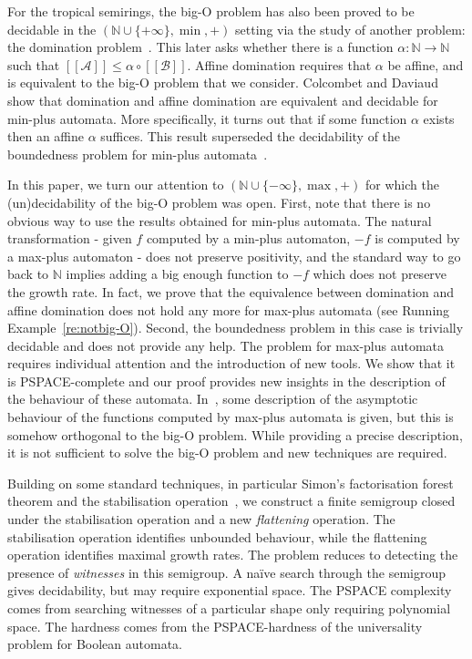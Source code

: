 \documentclass[10pt,a4paper]{amsart}
\theoremstyle{definition}
\numberwithin{equation}{section}
\theoremstyle{remark}
\newcommand{\autA}{\mathcal{A}}
\newcommand{\autB}{\mathcal{B}}
\newcommand{\brfunc}[1]{[\![#1]\!]}
\newcommand{\funcA}{\brfunc{\autA}}
\newcommand{\funcB}{\brfunc{\autB}}
\theoremstyle{remark}
\begin{document}
For the tropical semirings, the big-O problem has also been proved to be decidable in the $(\mathbb{N}\cup\{+\infty\},\min,+)$ setting via the study of another problem: the domination problem~\cite{Colcombet07, Colcombet09}. This later asks whether there is a function $\alpha:\mathbb{N} \to \mathbb{N}$ such that  $\funcA \le \alpha \circ \funcB$. Affine domination requires that $\alpha$ be affine, and is equivalent to the big-O problem that we consider. Colcombet and Daviaud~\cite{ColcombetD13} show that domination and affine domination are equivalent and decidable for min-plus automata. More specifically, it turns out that if some function $\alpha$ exists then an affine $\alpha$ suffices. This result superseded the decidability of the boundedness problem for min-plus automata~\cite{Hashiguchi91a, leung1988topological, Simon94}.

In this paper, we turn our attention to $(\mathbb{N}\cup\{-\infty\},\max,+)$ for which the (un)decidability of the big-O problem was open. First, note that there is no obvious way to use the results obtained for min-plus automata. The natural transformation - given $f$ computed by a min-plus automaton, $-f$ is computed by a max-plus automaton - does not preserve positivity, and the standard way to go back to $\mathbb{N}$ implies adding a big enough function to $-f$ which does not preserve the growth rate. In fact, we prove that the equivalence between domination and affine domination does not hold any more for max-plus automata (see Running Example~\ref{re:notbig-O}). Second, the boundedness problem in this case is trivially decidable and does not provide any help. The problem for max-plus automata requires individual attention and the introduction of new tools. We show that it is PSPACE-complete and our proof provides new insights in the description of the behaviour of these automata. In~\cite{ColcombetDZ14}, some description of the asymptotic behaviour of the functions computed by max-plus automata is given, but this is somehow orthogonal to the big-O problem. While providing a precise description, it is not sufficient to solve the big-O problem and new techniques are required.

Building on some standard techniques, in particular Simon's factorisation forest theorem and the stabilisation operation~\cite{Simon90,Colcombet07,Kufleitner08,KirstenL09,FijalkowGKO15,ColcombetD13,CzerwinskiLMPW22}, we construct a finite semigroup closed under the stabilisation operation and a new \emph{flattening} operation. The stabilisation operation identifies unbounded behaviour, while the flattening operation identifies maximal growth rates. The problem reduces to detecting the presence of \emph{witnesses} in this semigroup. A naïve search through the semigroup gives decidability, but may require exponential space. The PSPACE complexity comes from searching witnesses of a particular shape only requiring polynomial space. The hardness comes from the PSPACE-hardness of the universality problem for Boolean automata.
\end{document}
